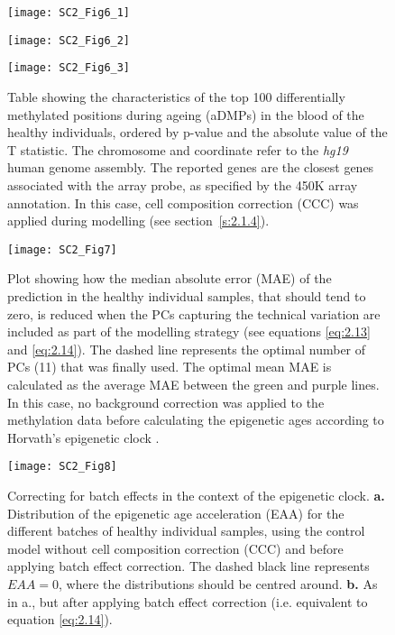 \begin{figure}[htbp!]
	\centering    
	\texttt{[image: SC2\_Fig6\_1]}
\end{figure}
\begin{figure}[htbp!]
	\centering    
	\texttt{[image: SC2\_Fig6\_2]}
\end{figure}
\begin{figure}[htbp!]
	\centering    
	\texttt{[image: SC2\_Fig6\_3]}
	\caption[Table showing the top 100 aDMPs]{Table showing the characteristics of the top 100 differentially methylated positions during ageing (aDMPs) in the blood of the healthy individuals, ordered by p-value and the absolute value of the T statistic. The chromosome and coordinate refer to the \textit{hg19} human genome assembly. The reported genes are the closest genes associated with the array probe, as specified by the 450K array annotation. In this case, cell composition correction (CCC) was applied during modelling (see section~\ref{s:2.1.4}).}
	\label{fig:sc2_fig6}
\end{figure}	

\begin{figure}[htbp!] 
	\centering    
	\vspace*{3mm}
	\texttt{[image: SC2\_Fig7]}
	\caption[Impact of the absence of background correction on the predictions from the epigenetic clock]{Plot showing how the median absolute error (MAE) of the prediction in the healthy individual samples, that should tend to zero, is reduced when the PCs capturing the technical variation are included as part of the modelling strategy (see equations \ref{eq:2.13} and \ref{eq:2.14}). The dashed line represents the optimal number of PCs (11) that was finally used. The optimal mean MAE is calculated as the average MAE between the green and purple lines. In this case, no background correction was applied to the methylation data before calculating the epigenetic ages according to Horvath's epigenetic clock \cite{Horvath2013}.}
	\label{fig:sc2_fig7}
\end{figure}

\begin{figure}[htbp!] 
	\centering    
	\texttt{[image: SC2\_Fig8]}
	\caption[Correcting for batch effects: control model without cell composition correction]{Correcting for batch effects in the context of the epigenetic clock. \textbf{a.} Distribution of the epigenetic age acceleration (EAA) for the different batches of healthy individual samples, using the control model without cell composition correction (CCC) and before applying batch effect correction. The dashed black line represents $EAA = 0$, where the distributions should be centred around. \textbf{b.} As in a., but after applying batch effect correction (i.e. equivalent to equation \ref{eq:2.14}).}
	\label{fig:sc2_fig8}
\end{figure}

